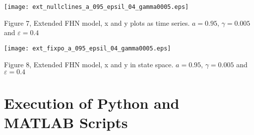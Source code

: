 \documentclass{article}
\begin{document}
\begin{center}
\texttt{[image: ext\_nullclines\_a\_095\_epsil\_04\_gamma0005.eps]}
\begin{footnotesize}
 Figure 7, Extended FHN model, x and y plots as time series. $a=0.95$, $\gamma=0.005$ and $\varepsilon=0.4$ 
\end{footnotesize}
\end{center}

\begin{center}
\texttt{[image: ext\_fixpo\_a\_095\_epsil\_04\_gamma0005.eps]}
\begin{footnotesize}
 Figure 8, Extended FHN model, x and y in state space. $a=0.95$, $\gamma=0.005$ and $\varepsilon=0.4$ 
\end{footnotesize}
\end{center}

\section{Execution of Python and MATLAB Scripts}
\end{document}
